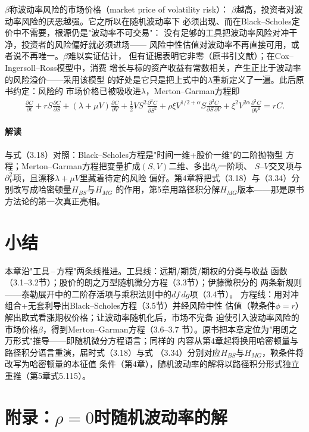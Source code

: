 $\beta$称波动率风险的市场价格（market price of volatility risk）：
$\beta$越高，投资者对波动率风险的厌恶越强。它之所以在随机波动率下
必须出现、而在Black--Scholes定价中不需要，根源仍是"波动率不可交易"：
没有足够的工具把波动率风险对冲干净，投资者的风险偏好就必须进场——
风险中性估值对波动率不再直接可用，或者说不再唯一。$\beta$难以实证估计，
但有证据表明它非零（原书引文献）；在Cox--Ingersoll--Ross模型中，消费
增长与标的资产收益有常数相关，产生正比于波动率的风险溢价——采用该模型
的好处是它只是把上式中的$\lambda$重新定义了一遍。此后原书约定：风险的
市场价格已被吸收进$\lambda$，Merton--Garman方程即
\begin{align*}
\frac{\partial C}{\partial t}
+rS\frac{\partial C}{\partial S}
+(\lambda+\mu V)\frac{\partial C}{\partial V}
+\frac{1}{2}VS^{2}\frac{\partial^{2}C}{\partial S^{2}}
+\rho\xi V^{1/2+\alpha}S\frac{\partial^{2}C}{\partial S\,\partial V}
+\xi^{2}V^{2\alpha}\frac{\partial^{2}C}{\partial V^{2}}
=rC.
\tag{3.34}
\end{align*}

\paragraph{解读}
与式（3.18）对照：Black--Scholes方程是"时间一维+股价一维"的二阶抛物型
方程；Merton--Garman方程把变量扩成$(S,V)$二维、多出$\partial_V$一阶项、
$S$--$V$交叉项与$\partial_V^2$项，且漂移$\lambda+\mu V$里藏着待定的风险
偏好。第4章将把式（3.18）与（3.34）分别改写成哈密顿量$H_{BS}$与$H_{MG}$
的作用，第5章用路径积分解$H_{MG}$版本——那是原书方法论的第一次真正亮相。

\section{小结}

本章沿"工具\,--\,方程"两条线推进。工具线：远期/期货/期权的分类与收益
函数（3.1--3.2节）；股价的朗之万型随机微分方程（3.3节）；伊藤微积分的
两条新规则——泰勒展开中的二阶存活项与乘积法则中的$df\,dg$项（3.4节）。
方程线：用对冲组合+无套利导出Black--Scholes方程（3.5节）并经风险中性
估值（鞅条件$\phi=r$）解出欧式看涨期权价格；让波动率随机化后，市场不完备
迫使引入波动率风险的市场价格$\beta$，得到Merton--Garman方程（3.6--3.7
节）。原书把本章定位为"用朗之万形式"推导——即随机微分方程语言；同样的
内容从第4章起将换用哈密顿量与路径积分语言重演，届时式（3.18）与式
（3.34）分别对应$H_{BS}$与$H_{MG}$，鞅条件将改写为哈密顿量的本征值
条件（第4章），随机波动率的解将以路径积分形式独立重推（第5章式5.115）。

\section{附录：$\rho=0$时随机波动率的解}

